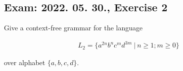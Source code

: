 \subsection{Exam: 2022. 05. 30., Exercise 2}


Give a context-free grammar for the language

\begin{align*}
L_2 = \{a^{2n}b^{n}c^{m}d^{3m} ~|~ n\geq{}1; m\geq{}0\}
\end{align*}

over alphabet $\{a,b,c,d\}$.



